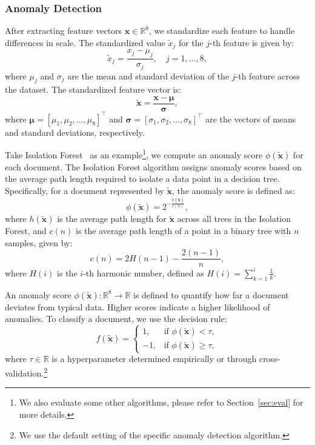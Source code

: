 \subsubsection{Anomaly Detection}
\label{sec:ad}
After extracting feature vectors $\mathbf{x} \in \mathbb{R}^8$, we standardize each feature to handle differences in scale. The standardized value $\tilde{x}_j$ for the $j$-th feature is given by:
\begin{equation}
\tilde{x}_j = \frac{x_j - \mu_j}{\sigma_j}, \quad j = 1, \ldots, 8,
\end{equation}
where $\mu_j$ and $\sigma_j$ are the mean and standard deviation of the $j$-th feature across the dataset. The standardized feature vector is:
\begin{equation}
    \tilde{\mathbf{x}} = \frac{\mathbf{x} - \boldsymbol{\mu}}{\boldsymbol{\sigma}},
\end{equation}
where $\boldsymbol{\mu} = [\mu_1, \mu_2, \ldots, \mu_8]^\top$ and $\boldsymbol{\sigma} = [\sigma_1, \sigma_2, \ldots, \sigma_8]^\top$ are the vectors of means and standard deviations, respectively.

Take Isolation Forest~\cite{liu2008isolation} as an example\footnote{We also evaluate some other algorithms, please refer to Section~\ref{sec:eval} for more details.}, we compute an anomaly score $\phi(\tilde{\mathbf{x}})$ for each document.
The Isolation Forest algorithm assigns anomaly scores based on the average path length required to isolate a data point in a decision tree. Specifically, for a document represented by $\tilde{\mathbf{x}}$, the anomaly score is defined as:
\begin{equation}
\phi(\tilde{\mathbf{x}}) = 2^{-\frac{h(\tilde{\mathbf{x}})}{c(n)}},
\end{equation}
where $h(\tilde{\mathbf{x}})$ is the average path length for $\tilde{\mathbf{x}}$ across all trees in the Isolation Forest, and $c(n)$ is the average path length of a point in a binary tree with $n$ samples, given by:
\begin{equation}
    c(n) = 2H(n-1) - \frac{2(n-1)}{n},
\end{equation}
where $H(i)$ is the $i$-th harmonic number, defined as $H(i) = \sum_{k=1}^i \frac{1}{k}$.

An anomaly score $\phi(\tilde{\mathbf{x}}): \mathbb{R}^8 \to \mathbb{R}$ is defined to quantify how far a document deviates from typical data.
Higher scores indicate a higher likelihood of anomalies.
To classify a document, we use the decision rule:
\begin{equation}
f(\tilde{\mathbf{x}}) =
\begin{cases}
1, & \text{if } \phi(\tilde{\mathbf{x}}) < \tau, \\
-1, & \text{if } \phi(\tilde{\mathbf{x}}) \geq \tau,
\end{cases}
\end{equation}
where $\tau \in \mathbb{R}$ is a hyperparameter determined empirically or through cross-validation.\footnote{We use the default setting of the specific anomaly detection algorithm.}

